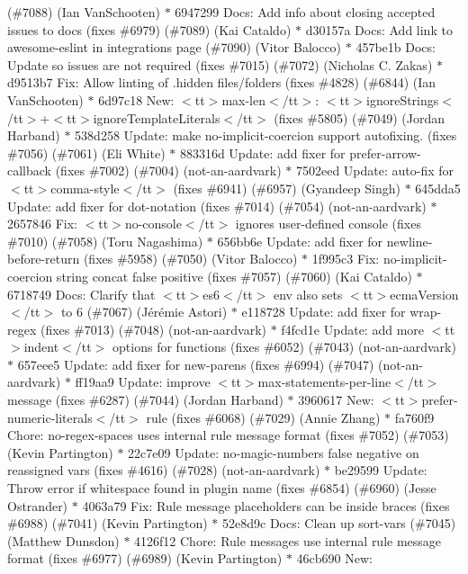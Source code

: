 \begin{DoxyItemize}
(\#7088) (\+Ian Van\+Schooten) \texorpdfstring{$\ast$}{*} 6947299 Docs\+: Add info about closing accepted issues to docs (fixes \#6979) (\#7089) (\+Kai Cataldo) \texorpdfstring{$\ast$}{*} d30157a Docs\+: Add link to awesome-\/eslint in integrations page (\#7090) (\+Vitor Balocco) \texorpdfstring{$\ast$}{*} 457be1b Docs\+: Update so issues are not required (fixes \#7015) (\#7072) (\+Nicholas C. Zakas) \texorpdfstring{$\ast$}{*} d9513b7 Fix\+: Allow linting of .\+hidden files/folders (fixes \#4828) (\#6844) (\+Ian Van\+Schooten) \texorpdfstring{$\ast$}{*} 6d97c18 New\+: $<$tt$>$max-\/len$<$/tt$>$\+: $<$tt$>$ignore\+Strings$<$/tt$>$+$<$tt$>$ignore\+Template\+Literals$<$/tt$>$ (fixes \#5805) (\#7049) (\+Jordan Harband) \texorpdfstring{$\ast$}{*} 538d258 Update\+: make no-\/implicit-\/coercion support autofixing. (fixes \#7056) (\#7061) (\+Eli White) \texorpdfstring{$\ast$}{*} 883316d Update\+: add fixer for prefer-\/arrow-\/callback (fixes \#7002) (\#7004) (not-\/an-\/aardvark) \texorpdfstring{$\ast$}{*} 7502eed Update\+: auto-\/fix for $<$tt$>$comma-\/style$<$/tt$>$ (fixes \#6941) (\#6957) (\+Gyandeep Singh) \texorpdfstring{$\ast$}{*} 645dda5 Update\+: add fixer for dot-\/notation (fixes \#7014) (\#7054) (not-\/an-\/aardvark) \texorpdfstring{$\ast$}{*} 2657846 Fix\+: $<$tt$>$no-\/console$<$/tt$>$ ignores user-\/defined console (fixes \#7010) (\#7058) (\+Toru Nagashima) \texorpdfstring{$\ast$}{*} 656bb6e Update\+: add fixer for newline-\/before-\/return (fixes \#5958) (\#7050) (\+Vitor Balocco) \texorpdfstring{$\ast$}{*} 1f995c3 Fix\+: no-\/implicit-\/coercion string concat false positive (fixes \#7057) (\#7060) (\+Kai Cataldo) \texorpdfstring{$\ast$}{*} 6718749 Docs\+: Clarify that $<$tt$>$es6$<$/tt$>$ env also sets $<$tt$>$ecma\+Version$<$/tt$>$ to 6 (\#7067) (\+Jérémie Astori) \texorpdfstring{$\ast$}{*} e118728 Update\+: add fixer for wrap-\/regex (fixes \#7013) (\#7048) (not-\/an-\/aardvark) \texorpdfstring{$\ast$}{*} f4fcd1e Update\+: add more $<$tt$>$indent$<$/tt$>$ options for functions (fixes \#6052) (\#7043) (not-\/an-\/aardvark) \texorpdfstring{$\ast$}{*} 657eee5 Update\+: add fixer for new-\/parens (fixes \#6994) (\#7047) (not-\/an-\/aardvark) \texorpdfstring{$\ast$}{*} ff19aa9 Update\+: improve $<$tt$>$max-\/statements-\/per-\/line$<$/tt$>$ message (fixes \#6287) (\#7044) (\+Jordan Harband) \texorpdfstring{$\ast$}{*} 3960617 New\+: $<$tt$>$prefer-\/numeric-\/literals$<$/tt$>$ rule (fixes \#6068) (\#7029) (\+Annie Zhang) \texorpdfstring{$\ast$}{*} fa760f9 Chore\+: no-\/regex-\/spaces uses internal rule message format (fixes \#7052) (\#7053) (\+Kevin Partington) \texorpdfstring{$\ast$}{*} 22c7e09 Update\+: no-\/magic-\/numbers false negative on reassigned vars (fixes \#4616) (\#7028) (not-\/an-\/aardvark) \texorpdfstring{$\ast$}{*} be29599 Update\+: Throw error if whitespace found in plugin name (fixes \#6854) (\#6960) (\+Jesse Ostrander) \texorpdfstring{$\ast$}{*} 4063a79 Fix\+: Rule message placeholders can be inside braces (fixes \#6988) (\#7041) (\+Kevin Partington) \texorpdfstring{$\ast$}{*} 52e8d9c Docs\+: Clean up sort-\/vars (\#7045) (\+Matthew Dunsdon) \texorpdfstring{$\ast$}{*} 4126f12 Chore\+: Rule messages use internal rule message format (fixes \#6977) (\#6989) (\+Kevin Partington) \texorpdfstring{$\ast$}{*} 46cb690 New\+: 
\end{DoxyItemize}
